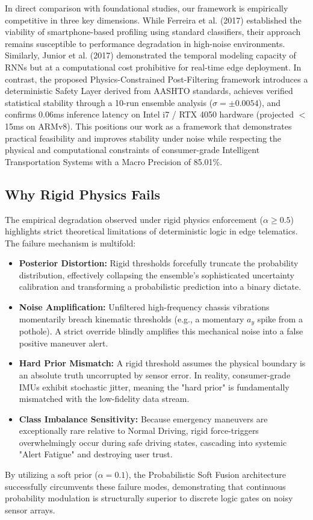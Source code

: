 \documentclass[pdflatex,sn-mathphys-num]{sn-jnl}
\theoremstyle{thmstyleone}
\theoremstyle{thmstyletwo}
\theoremstyle{thmstylethree}
\begin{document}
In direct comparison with foundational studies, our framework is empirically competitive in three key dimensions. While Ferreira et al. (2017) \cite{ferreira2017} established the viability of smartphone-based profiling using standard classifiers, their approach remains susceptible to performance degradation in high-noise environments. Similarly, Junior et al. (2017) \cite{junior2017} demonstrated the temporal modeling capacity of RNNs but at a computational cost prohibitive for real-time edge deployment. In contrast, the proposed Physics-Constrained Post-Filtering framework introduces a deterministic Safety Layer derived from AASHTO standards, achieves verified statistical stability through a 10-run ensemble analysis ($\sigma = \pm0.0054$), and confirms 0.06ms inference latency on Intel i7 / RTX 4050 hardware (projected $<$15ms on ARMv8). This positions our work as a framework that demonstrates practical feasibility and improves stability under noise while respecting the physical and computational constraints of consumer-grade Intelligent Transportation Systems with a Macro Precision of 85.01\%.

\FloatBarrier
\subsection{Why Rigid Physics Fails}
The empirical degradation observed under rigid physics enforcement ($\alpha \ge 0.5$) highlights strict theoretical limitations of deterministic logic in edge telematics. The failure mechanism is multifold:
\begin{itemize}
    \item \textbf{Posterior Distortion:} Rigid thresholds forcefully truncate the probability distribution, effectively collapsing the ensemble's sophisticated uncertainty calibration and transforming a probabilistic prediction into a binary dictate.
    \item \textbf{Noise Amplification:} Unfiltered high-frequency chassis vibrations momentarily breach kinematic thresholds (e.g., a momentary $a_y$ spike from a pothole). A strict override blindly amplifies this mechanical noise into a false positive maneuver alert.
    \item \textbf{Hard Prior Mismatch:} A rigid threshold assumes the physical boundary is an absolute truth uncorrupted by sensor error. In reality, consumer-grade IMUs exhibit stochastic jitter, meaning the "hard prior" is fundamentally mismatched with the low-fidelity data stream.
    \item \textbf{Class Imbalance Sensitivity:} Because emergency maneuvers are exceptionally rare relative to Normal Driving, rigid force-triggers overwhelmingly occur during safe driving states, cascading into systemic "Alert Fatigue" and destroying user trust.
\end{itemize}
By utilizing a soft prior ($\alpha=0.1$), the Probabilistic Soft Fusion architecture successfully circumvents these failure modes, demonstrating that continuous probability modulation is structurally superior to discrete logic gates on noisy sensor arrays.
\end{document}
